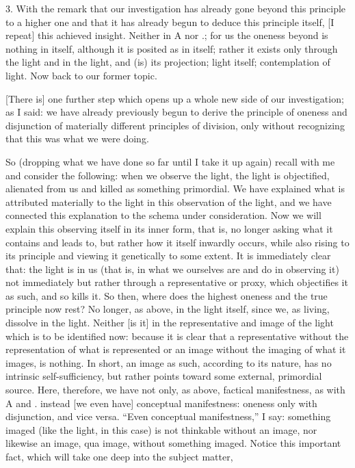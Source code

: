 3. With the remark that our investigation has
already gone beyond this principle to a higher one
and that it has already begun to deduce this principle itself,
[I repeat] this achieved insight.
Neither in A nor .;
for us the oneness beyond is nothing in itself,
although it is posited as in itself;
rather it exists only through the light
and in the light, and (is) its projection;
light itself; contemplation of light.
Now back to our former topic.

[There is] one further step which opens up
a whole new side of our investigation;
as I said: we have already previously begun to
derive the principle of oneness and disjunction of
materially different principles of division,
only without recognizing that this was what we were doing.

So (dropping what we have done so far until I take it up again)
recall with me and consider the following:
when we observe the light, the light is objectified,
alienated from us and killed as something primordial.
We have explained what is attributed materially to
the light in this observation of the light,
and we have connected this explanation to
the schema under consideration.
Now we will explain this observing itself
in its inner form, that is,
no longer asking what it contains and leads to,
but rather how it itself inwardly occurs,
while also rising to its principle
and viewing it genetically to some extent.
It is immediately clear that:
the light is in us
(that is, in what we ourselves are and do in observing it)
not immediately but rather through a representative or proxy,
which objectifies it as such, and so kills it.
So then, where does the highest oneness and
the true principle now rest?
No longer, as above, in the light itself,
since we, as living, dissolve in the light.
Neither [is it] in the representative and image
of the light which is to be identified now:
because it is clear that a representative
without the representation of what is represented
or an image without the imaging of what it images,
is nothing.
In short, an image as such, according to its nature,
has no intrinsic self-sufficiency,
but rather points toward some external, primordial source.
Here, therefore, we have not only, as above,
factical manifestness, as with A and .
instead [we even have] conceptual manifestness:
oneness only with disjunction, and vice versa.
“Even conceptual manifestness,” I say:
something imaged (like the light, in this case)
is not thinkable without an image,
nor likewise an image, qua image,
without something imaged.
Notice this important fact,
which will take one deep into the subject matter,
